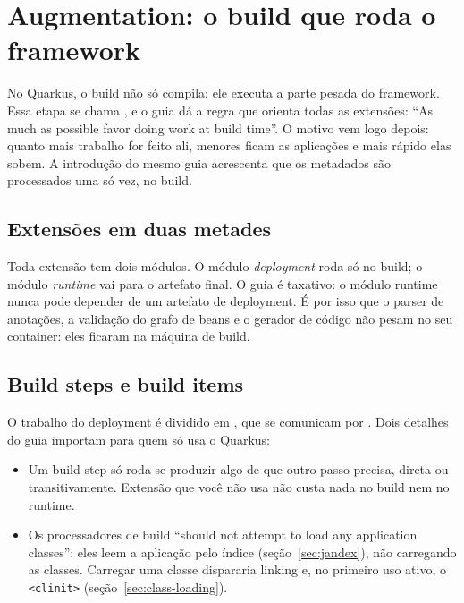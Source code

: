 \section{Augmentation: o build que roda o framework}
\label{sec:augmentation}

No Quarkus, o build não só compila: ele executa a parte pesada do
framework. Essa etapa se chama , e o guia
 dá a regra que orienta todas
as extensões: \enquote{As much as possible favor doing work at build
time}. O motivo vem logo depois: quanto mais trabalho for feito ali,
menores ficam as aplicações e mais rápido elas sobem. A introdução do
mesmo guia acrescenta que os metadados são processados uma só vez, no
build.

\subsection*{Extensões em duas metades}

Toda extensão tem dois módulos. O módulo \emph{deployment} roda só no
build; o módulo \emph{runtime} vai para o artefato final. O guia é
taxativo: o módulo runtime nunca pode depender de um artefato de
deployment. É por isso que o parser de anotações, a validação do grafo
de beans e o gerador de código não pesam no seu container: eles ficaram
na máquina de build.

\subsection*{Build steps e build items}

O trabalho do deployment é dividido em , que se comunicam por . Dois detalhes do guia
importam para quem só usa o Quarkus:
\begin{itemize}
\item Um build step só roda se produzir algo de que outro passo precisa,
  direta ou transitivamente. Extensão que você não usa não custa nada no
  build nem no runtime.
\item Os processadores de build \enquote{should not attempt to load any
  application classes}: eles leem a aplicação pelo índice
  (seção~\ref{sec:jandex}), não carregando as classes. Carregar uma classe
  dispararia linking e, no primeiro uso ativo, o \texttt{<clinit>}
  (seção~\ref{sec:class-loading}).
\end{itemize}

